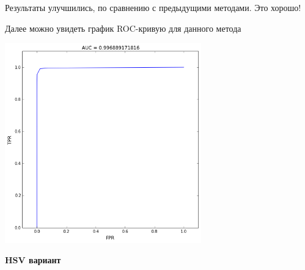 \documentclass[12pt, a4paper]{article}
\begin{document}
			Результаты улучшились, по сравнению с предыдущими методами. Это хорошо!

			Далее можно увидеть график ROC-кривую для данного метода
			\begin{center}
				\includegraphics[width=8.5cm]{3_par_rgb_auc.png}
			\end{center}


			\newpage
			{\bf\centering HSV вариант}
\end{document}
